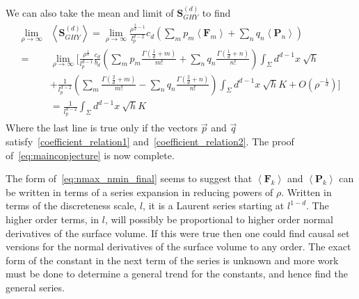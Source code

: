 \documentclass[12pt]{article}
\newcommand{\BF}[1]{\mathbf{F}_{#1}}
\newcommand{\BP}[1]{\mathbf{P}_{#1}}
\begin{document}
We can also take the mean and limit of $\textbf{S}^{ (d)}_{GHY}$ to find
\begin{gather}\label{eq:boundary_final_proof}
\begin{aligned}
\lim_{\rho\rightarrow\infty} & \left\langle \textbf{S}^{ (d)}_{GHY}\right\rangle = \lim_{\rho\rightarrow\infty} \frac{\rho^{\frac{2}{d}-1}}{l_p^{d-2}} c_{d}\left (\sum_m p_m \left\langle\textbf{F}_m\right\rangle  + \sum_n q_n \left\langle\textbf{P}_n\right\rangle\right)
\\
= & \lim_{\rho\rightarrow\infty}\Bigg[\frac{\rho^{\frac{1}{d}}}{l_p^{d-1}}\frac{c_d}{b_d}\left(\sum_m p_m \frac{\Gamma\left (\frac{1}{d}+m \right)}{m!}  + \sum_n q_n\frac{\Gamma\left (\frac{1}{d}+n \right)}{n!} \right) \int_{\Sigma}d^{d-1}x\: \sqrt{h}
\\
& +\frac{1}{l_p^{d-2}}\left(\sum_m\frac{\Gamma\left (\frac{2}{d}+m \right)}{m!}  - \sum_n q_n\frac{\Gamma\left (\frac{2}{d}+n \right)}{n!} \right) \int_{\Sigma}d^{d-1}x\: \sqrt{h}K + O(\rho^{-\frac{1}{d}})\Bigg]
\\
& = \frac{1}{l_p^{d-2}}\int_{\Sigma}d^{d-1}x\: \sqrt{h}K
\end{aligned}
\end{gather}
Where the last line is true only if the vectors $\vec{p}$ and $\vec{q}$ satisfy~\eqref{coefficient_relation1} and~\eqref{coefficient_relation2}. The proof of~\eqref{eq:mainconjecture} is now complete.

The form of~\eqref{eq:nmax_nmin_final} seems to suggest that $\left\langle \BF{k}\right\rangle$ and $\left\langle \BP{k}\right\rangle$ can be written in terms of a series expansion in reducing powers of $\rho$. Written in terms of the discreteness scale, $l$, it is a Laurent series starting at $l^{1-d}$. The higher order terms, in $l$, will possibly be proportional to higher order normal derivatives of the surface volume. If this were true then one could find causal set versions for the normal derivatives of the surface volume to any order. The exact form of the constant in the next term of the series is unknown and more work must be done to determine a general trend for the constants, and hence find the general series.
\end{document}
